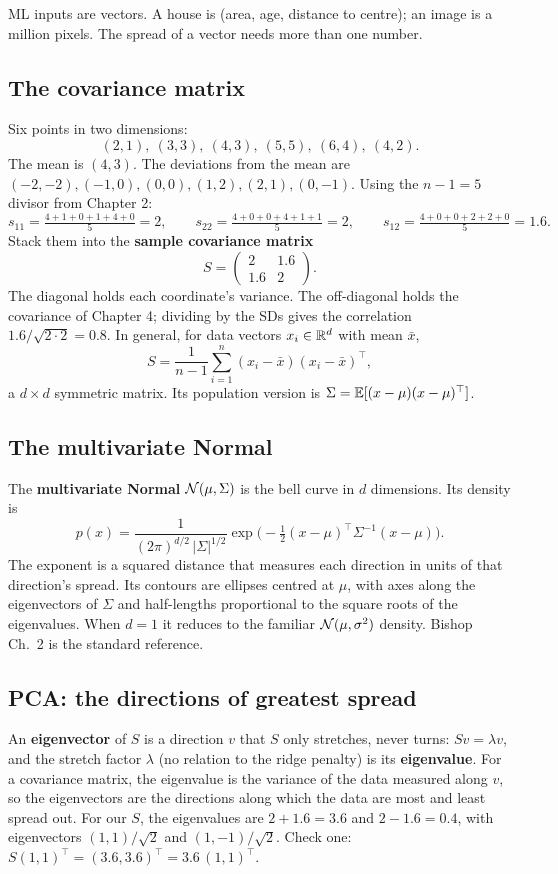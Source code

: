 ML inputs are vectors. A house is (area, age, distance to centre); an image is a million
pixels. The spread of a vector needs more than one number.

\subsection{The covariance matrix}

Six points in two dimensions:
\[
(2,1),\ (3,3),\ (4,3),\ (5,5),\ (6,4),\ (4,2).
\]
The mean is $(4,3)$. The deviations from the mean are
$(-2,-2),(-1,0),(0,0),(1,2),(2,1),(0,-1)$. Using the $n-1=5$ divisor from Chapter 2:
\[
s_{11} = \tfrac{4+1+0+1+4+0}{5} = 2,\qquad
s_{22} = \tfrac{4+0+0+4+1+1}{5} = 2,\qquad
s_{12} = \tfrac{4+0+0+2+2+0}{5} = 1.6 .
\]
Stack them into the \textbf{sample covariance matrix}
\[
S = \begin{pmatrix} 2 & 1.6 \\ 1.6 & 2 \end{pmatrix}.
\]
The diagonal holds each coordinate's variance. The off-diagonal holds the covariance of
Chapter 4; dividing by the SDs gives the correlation $1.6/\sqrt{2\cdot2}=0.8$. In general, for
data vectors $x_i\in\mathbb{R}^d$ with mean $\bar x$,
\[
S = \frac{1}{n-1}\sum_{i=1}^n (x_i-\bar x)(x_i-\bar x)^\top ,
\]
a $d\times d$ symmetric matrix. Its population version is
$\Sigma = \operatorname{\mathbb{E}}[(x-\mu)(x-\mu)^\top]$.

\subsection{The multivariate Normal}

The \textbf{multivariate Normal} $\mathcal{N}(\mu,\Sigma)$ is the bell curve in $d$ dimensions. Its
density is
\[
p(x) = \frac{1}{(2\pi)^{d/2}\,|\Sigma|^{1/2}}
\exp\!\Big(-\tfrac12 (x-\mu)^\top\Sigma^{-1}(x-\mu)\Big).
\]
The exponent is a squared distance that measures each direction in units of that direction's
spread. Its contours are ellipses centred at $\mu$, with axes along the eigenvectors of
$\Sigma$ and half-lengths proportional to the square roots of the eigenvalues. When $d=1$ it
reduces to the familiar $\mathcal{N}(\mu,\sigma^2)$ density. Bishop Ch.~2 is the standard reference.

\subsection{PCA: the directions of greatest spread}

An \textbf{eigenvector} of $S$ is a direction $v$ that $S$ only stretches, never turns:
$Sv=\lambda v$, and the stretch factor $\lambda$ (no relation to the ridge penalty) is its
\textbf{eigenvalue}. For a covariance
matrix, the eigenvalue is the variance of the data measured along $v$, so the eigenvectors are
the directions along which the data are most and least spread out. For our $S$, the eigenvalues are $2+1.6=3.6$ and $2-1.6=0.4$, with eigenvectors
$(1,1)/\sqrt2$ and $(1,-1)/\sqrt2$. Check one: $S(1,1)^\top = (3.6,3.6)^\top = 3.6\,(1,1)^\top$.


